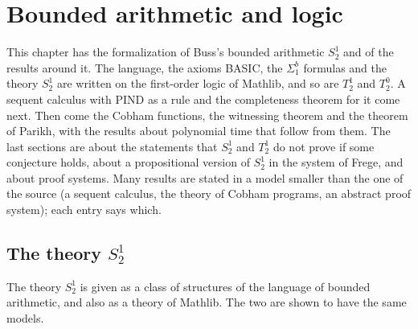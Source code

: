 \chapter{Bounded arithmetic and logic}
\label{chap:arithmetic}

This chapter has the formalization of Buss's bounded arithmetic $S^1_2$ and of the results around it.
The language, the axioms BASIC, the $\Sigma^b_1$ formulas and the theory $S^1_2$ are written on the
first-order logic of Mathlib, and so are $T^1_2$ and $T^0_2$. A sequent calculus with PIND as a rule
and the completeness theorem for it come next. Then come the Cobham functions, the witnessing theorem
and the theorem of Parikh, with the results about polynomial time that follow from them. The last
sections are about the statements that $S^1_2$ and $T^1_2$ do not prove if some conjecture holds,
about a propositional version of $S^1_2$ in the system of Frege, and about proof systems. Many results
are stated in a model smaller than the one of the source (a sequent calculus, the theory of Cobham
programs, an abstract proof system); each entry says which.

\section{The theory $S^1_2$}
\label{sec:arithmetic-s12}

The theory $S^1_2$ is given as a class of structures of the language of bounded arithmetic, and also
as a theory of Mathlib. The two are shown to have the same models.

